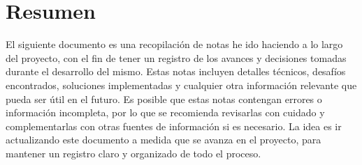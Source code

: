 \section*{Resumen}

El siguiente documento es una recopilación de notas he ido haciendo a lo largo del proyecto, con el fin de tener un registro de los avances y decisiones tomadas durante el desarrollo del mismo. Estas notas incluyen detalles técnicos, desafíos encontrados, soluciones implementadas y cualquier otra información relevante que pueda ser útil en el futuro. Es posible que estas notas contengan errores o información incompleta, por lo que se recomienda revisarlas con cuidado y complementarlas con otras fuentes de información si es necesario. La idea es ir actualizando este documento a medida que se avanza en el proyecto, para mantener un registro claro y organizado de todo el proceso.
